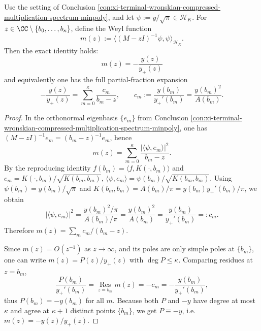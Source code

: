 \begin{conclusion}[Closed form of the Weyl function: \texorpdfstring{$m(z)=-y/y_{+}$}{m(z)=-y/y+}]\label{con:xi-terminal-wronskian-weyl-function-closed-form}
Use the setting of Conclusion \ref{con:xi-terminal-wronskian-compressed-multiplication-spectrum-minpoly}, and let
\(
\psi:=y/\sqrt{\pi}\in\mathcal{H}_K
\).
For \(z\in\CC\setminus\{b_0,\dots,b_\kappa\}\), define the Weyl function
\[
m(z):=\langle (M-zI)^{-1}\psi,\psi\rangle_{\mathcal{H}_K}.
\]
Then the exact identity holds:
\[
\boxed{\;m(z)=-\frac{y(z)}{y_{+}(z)}\;}
\]
and equivalently one has the full partial-fraction expansion
\[
-\frac{y(z)}{y_{+}(z)}=\sum_{m=0}^{\kappa}\frac{c_m}{b_m-z},
\qquad
c_m:=\frac{y(b_m)}{y_{+}'(b_m)}=\frac{y(b_m)^2}{A(b_m)}.
\]
\end{conclusion}
\begin{proof}[Proof]
In the orthonormal eigenbasis \(\{e_m\}\) from Conclusion \ref{con:xi-terminal-wronskian-compressed-multiplication-spectrum-minpoly}, one has
\((M-zI)^{-1}e_m=(b_m-z)^{-1}e_m\), hence
\[
m(z)=\sum_{m=0}^{\kappa}\frac{|\langle \psi,e_m\rangle|^2}{b_m-z}.
\]
By the reproducing identity \(f(b_m)=\langle f,K(\cdot,b_m)\rangle\) and \(e_m=K(\cdot,b_m)/\sqrt{K(b_m,b_m)}\),
\(
\langle \psi,e_m\rangle=\psi(b_m)/\sqrt{K(b_m,b_m)}
\).
Using \(\psi(b_m)=y(b_m)/\sqrt{\pi}\) and
\(
K(b_m,b_m)=A(b_m)/\pi=y(b_m)y_{+}'(b_m)/\pi
\), we obtain
\[
|\langle \psi,e_m\rangle|^2
=\frac{y(b_m)^2/\pi}{A(b_m)/\pi}
=\frac{y(b_m)^2}{A(b_m)}
=\frac{y(b_m)}{y_{+}'(b_m)}
=:c_m.
\]
Therefore \(m(z)=\sum_m c_m/(b_m-z)\).

Since \(m(z)=O(z^{-1})\) as \(z\to\infty\), and its poles are only simple poles at \(\{b_m\}\), one can write
\(m(z)=P(z)/y_{+}(z)\) with \(\deg P\le \kappa\).
Comparing residues at \(z=b_m\),
\[
\frac{P(b_m)}{y_{+}'(b_m)}=\operatorname*{Res}_{z=b_m}m(z)=-c_m=-\frac{y(b_m)}{y_{+}'(b_m)},
\]
thus \(P(b_m)=-y(b_m)\) for all \(m\).
Because both \(P\) and \(-y\) have degree at most \(\kappa\) and agree at \(\kappa+1\) distinct points \(\{b_m\}\), we get \(P\equiv -y\), i.e. \(m(z)=-y(z)/y_{+}(z)\).
\end{proof}

